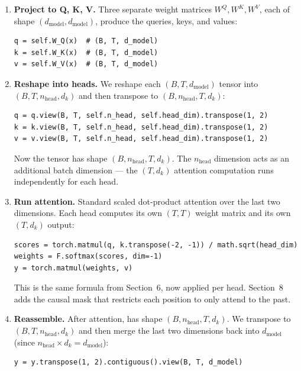 \begin{enumerate}
  \item \textbf{Project to Q, K, V.} Three separate weight matrices $W^Q, W^K, W^V$, each of shape $(d_{\text{model}}, d_{\text{model}})$, produce the queries, keys, and values:

\concepttag
\begin{lstlisting}
q = self.W_Q(x)  # (B, T, d_model)
k = self.W_K(x)  # (B, T, d_model)
v = self.W_V(x)  # (B, T, d_model)
\end{lstlisting}

  \item \textbf{Reshape into heads.} We reshape each $(B, T, d_{\text{model}})$ tensor into $(B, T, n_{\text{head}}, d_k)$ and then transpose to $(B, n_{\text{head}}, T, d_k)$:

\begin{lstlisting}
q = q.view(B, T, self.n_head, self.head_dim).transpose(1, 2)
k = k.view(B, T, self.n_head, self.head_dim).transpose(1, 2)
v = v.view(B, T, self.n_head, self.head_dim).transpose(1, 2)
\end{lstlisting}

Now the tensor has shape $(B, n_{\text{head}}, T, d_k)$. The $n_{\text{head}}$ dimension acts as an additional batch dimension --- the $(T, d_k)$ attention computation runs independently for each head.

  \item \textbf{Run attention.} Standard scaled dot-product attention over the last two dimensions. Each head computes its own $(T, T)$ weight matrix and its own $(T, d_k)$ output:

\begin{lstlisting}
scores = torch.matmul(q, k.transpose(-2, -1)) / math.sqrt(head_dim)
weights = F.softmax(scores, dim=-1)
y = torch.matmul(weights, v)
\end{lstlisting}

This is the same formula from Section~6, now applied per head. Section~8 adds the causal mask that restricts each position to only attend to the past.

  \item \textbf{Reassemble.} After attention,  has shape $(B, n_{\text{head}}, T, d_k)$. We transpose to $(B, T, n_{\text{head}}, d_k)$ and then merge the last two dimensions back into $d_{\text{model}}$ (since $n_{\text{head}} \times d_k = d_{\text{model}}$):

\begin{lstlisting}
y = y.transpose(1, 2).contiguous().view(B, T, d_model)
\end{lstlisting}


\end{enumerate}
